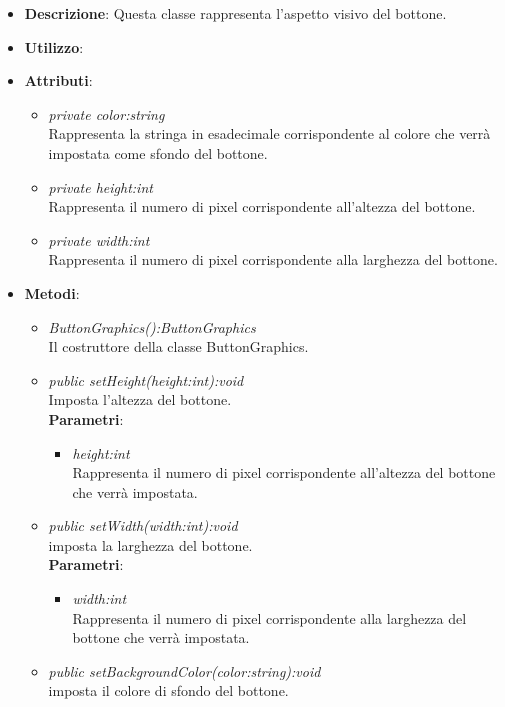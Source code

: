 \begin{itemize}
\item \textbf{Descrizione}: Questa classe rappresenta l'aspetto visivo del bottone.
\item \textbf{Utilizzo}:
\item \textbf{Attributi}:
	\begin{itemize}
	\item \textit{private color:string}\\
	Rappresenta la stringa in esadecimale corrispondente al colore che verrà impostata come sfondo del bottone.
	\item \textit{private height:int}\\
	Rappresenta il numero di pixel corrispondente all'altezza del bottone. 
	\item \textit{private width:int}\\
	Rappresenta il numero di pixel corrispondente alla larghezza del bottone.
	\end{itemize}
\item \textbf{Metodi}:
	\begin{itemize}
	\item \textit{ButtonGraphics():ButtonGraphics}\\
	Il costruttore della classe ButtonGraphics.
	\item \textit{public setHeight(height:int):void}\\
	Imposta l'altezza del bottone.
		\\ \textbf{Parametri}: \begin{itemize}
		\item \textit{height:int}\\
		Rappresenta il numero di pixel corrispondente all'altezza del bottone che verrà impostata.
		\end{itemize}
	\item \textit{public setWidth(width:int):void}\\
	imposta la larghezza del bottone.
		\\ \textbf{Parametri}: \begin{itemize}
		\item \textit{width:int}\\
		Rappresenta il numero di pixel corrispondente alla larghezza del bottone che verrà impostata.
		\end{itemize}
	\item \textit{public setBackgroundColor(color:string):void}\\
	imposta il colore di sfondo del bottone.

\end{itemize}
\end{itemize}
